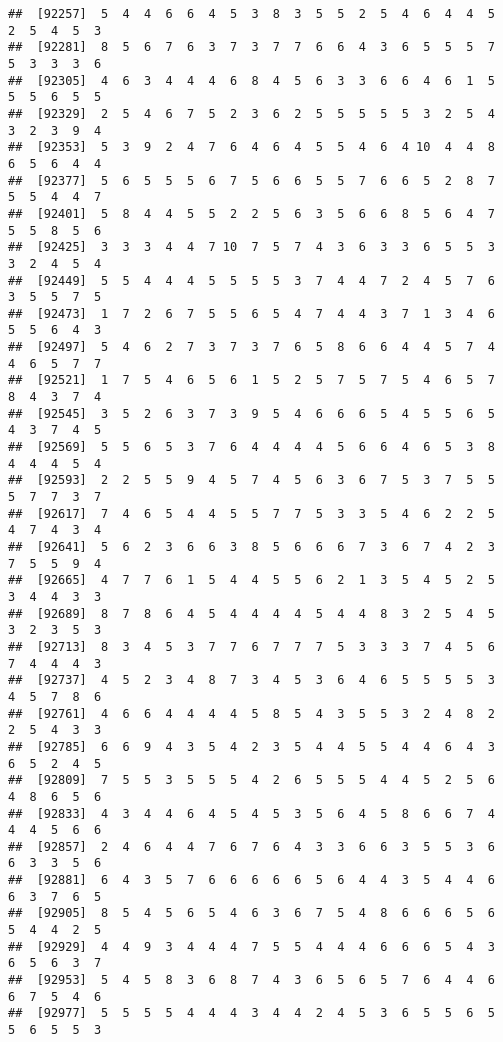 \documentclass[
]{book}
\begin{document}
\begin{verbatim}
##  [92257]  5  4  4  6  6  4  5  3  8  3  5  5  2  5  4  6  4  4  5  2  5  4  5  3
##  [92281]  8  5  6  7  6  3  7  3  7  7  6  6  4  3  6  5  5  5  7  5  3  3  3  6
##  [92305]  4  6  3  4  4  4  6  8  4  5  6  3  3  6  6  4  6  1  5  5  5  6  5  5
##  [92329]  2  5  4  6  7  5  2  3  6  2  5  5  5  5  5  3  2  5  4  3  2  3  9  4
##  [92353]  5  3  9  2  4  7  6  4  6  4  5  5  4  6  4 10  4  4  8  6  5  6  4  4
##  [92377]  5  6  5  5  5  6  7  5  6  6  5  5  7  6  6  5  2  8  7  5  5  4  4  7
##  [92401]  5  8  4  4  5  5  2  2  5  6  3  5  6  6  8  5  6  4  7  5  5  8  5  6
##  [92425]  3  3  3  4  4  7 10  7  5  7  4  3  6  3  3  6  5  5  3  3  2  4  5  4
##  [92449]  5  5  4  4  4  5  5  5  5  3  7  4  4  7  2  4  5  7  6  3  5  5  7  5
##  [92473]  1  7  2  6  7  5  5  6  5  4  7  4  4  3  7  1  3  4  6  5  5  6  4  3
##  [92497]  5  4  6  2  7  3  7  3  7  6  5  8  6  6  4  4  5  7  4  4  6  5  7  7
##  [92521]  1  7  5  4  6  5  6  1  5  2  5  7  5  7  5  4  6  5  7  8  4  3  7  4
##  [92545]  3  5  2  6  3  7  3  9  5  4  6  6  6  5  4  5  5  6  5  4  3  7  4  5
##  [92569]  5  5  6  5  3  7  6  4  4  4  4  5  6  6  4  6  5  3  8  4  4  4  5  4
##  [92593]  2  2  5  5  9  4  5  7  4  5  6  3  6  7  5  3  7  5  5  5  7  7  3  7
##  [92617]  7  4  6  5  4  4  5  5  7  7  5  3  3  5  4  6  2  2  5  4  7  4  3  4
##  [92641]  5  6  2  3  6  6  3  8  5  6  6  6  7  3  6  7  4  2  3  7  5  5  9  4
##  [92665]  4  7  7  6  1  5  4  4  5  5  6  2  1  3  5  4  5  2  5  3  4  4  3  3
##  [92689]  8  7  8  6  4  5  4  4  4  4  5  4  4  8  3  2  5  4  5  3  2  3  5  3
##  [92713]  8  3  4  5  3  7  7  6  7  7  7  5  3  3  3  7  4  5  6  7  4  4  4  3
##  [92737]  4  5  2  3  4  8  7  3  4  5  3  6  4  6  5  5  5  5  3  4  5  7  8  6
##  [92761]  4  6  6  4  4  4  4  5  8  5  4  3  5  5  3  2  4  8  2  2  5  4  3  3
##  [92785]  6  6  9  4  3  5  4  2  3  5  4  4  5  5  4  4  6  4  3  6  5  2  4  5
##  [92809]  7  5  5  3  5  5  5  4  2  6  5  5  5  4  4  5  2  5  6  4  8  6  5  6
##  [92833]  4  3  4  4  6  4  5  4  5  3  5  6  4  5  8  6  6  7  4  4  4  5  6  6
##  [92857]  2  4  6  4  4  7  6  7  6  4  3  3  6  6  3  5  5  3  6  6  3  3  5  6
##  [92881]  6  4  3  5  7  6  6  6  6  6  5  6  4  4  3  5  4  4  6  6  3  7  6  5
##  [92905]  8  5  4  5  6  5  4  6  3  6  7  5  4  8  6  6  6  5  6  5  4  4  2  5
##  [92929]  4  4  9  3  4  4  4  7  5  5  4  4  4  6  6  6  5  4  3  6  5  6  3  7
##  [92953]  5  4  5  8  3  6  8  7  4  3  6  5  6  5  7  6  4  4  6  6  7  5  4  6
##  [92977]  5  5  5  5  4  4  4  3  4  4  2  4  5  3  6  5  5  6  5  5  6  5  5  3

\end{verbatim}
\end{document}
